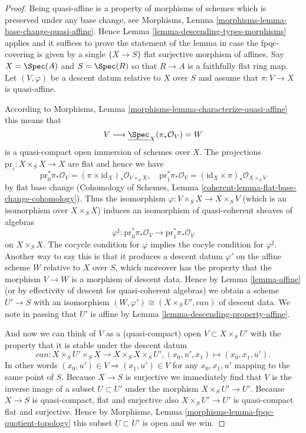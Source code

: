 \begin{proof}
Being quasi-affine is a property of morphisms of schemes
which is preserved under any base change, see
Morphisms, Lemma \ref{morphisms-lemma-base-change-quasi-affine}.
Hence Lemma \ref{lemma-descending-types-morphisms} applies
and it suffices to prove the statement of the lemma
in case the fpqc-covering is given by a single
$\{X \to S\}$ flat surjective morphism of affines.
Say $X = \Spec(A)$ and $S = \Spec(R)$ so
that $R \to A$ is a faithfully flat ring map.
Let $(V, \varphi)$ be a descent datum relative to $X$ over $S$
and assume that $\pi : V \to X$ is quasi-affine.

\medskip\noindent
According to Morphisms, Lemma \ref{morphisms-lemma-characterize-quasi-affine}
this means that
$$
V \longrightarrow \underline{\Spec}_X(\pi_*\mathcal{O}_V) = W
$$
is a quasi-compact open immersion of schemes over $X$.
The projections $\text{pr}_i : X \times_S X \to X$ are flat
and hence we have
$$
\text{pr}_0^*\pi_*\mathcal{O}_V =
(\pi \times \text{id}_X)_*\mathcal{O}_{V \times_S X}, \quad
\text{pr}_1^*\pi_*\mathcal{O}_V =
(\text{id}_X \times \pi)_*\mathcal{O}_{X \times_S V}
$$
by flat base change
(Cohomology of Schemes, Lemma \ref{coherent-lemma-flat-base-change-cohomology}).
Thus the isomorphism $\varphi : V \times_S X \to X \times_S V$ (which
is an isomorphism over $X \times_S X$) induces an isomorphism
of quasi-coherent sheaves of algebras
$$
\varphi^\sharp :
\text{pr}_0^*\pi_*\mathcal{O}_V
\longrightarrow
\text{pr}_1^*\pi_*\mathcal{O}_V
$$
on $X \times_S X$.
The cocycle condition for $\varphi$ implies the cocyle condition
for $\varphi^\sharp$. Another way to say this is that it produces
a descent datum $\varphi'$ on the affine scheme $W$ relative to
$X$ over $S$, which moreover has the property that the morphism
$V \to W$ is a morphism of descent data.
Hence by Lemma \ref{lemma-affine}
(or by effectivity of descent for quasi-coherent
algebras) we obtain a scheme $U' \to S$ with an isomorphism
$(W, \varphi') \cong (X \times_S U', can)$ of descent data.
We note in passing that $U'$ is affine by
Lemma \ref{lemma-descending-property-affine}.

\medskip\noindent
And now we can think of $V$ as a (quasi-compact)
open $V \subset X \times_S U'$ with the property that
it is stable under the descent datum
$$
can : X \times_S U' \times_S X \to X \times_S X \times_S U',
(x_0, u', x_1) \mapsto (x_0, x_1, u').
$$
In other words $(x_0, u') \in V \Rightarrow (x_1, u') \in V$
for any $x_0, x_1, u'$ mapping to the same point of $S$.
Because $X \to S$ is surjective we immediately find that
$V$ is the inverse image of a subset $U \subset U'$ under
the morphism $X \times_S U' \to U'$.
Because $X \to S$ is quasi-compact, flat and surjective
also $X \times_S U' \to U'$ is quasi-compact flat and surjective.
Hence by Morphisms, Lemma \ref{morphisms-lemma-fpqc-quotient-topology}
this subset $U \subset U'$ is open and we win.
\end{proof}












